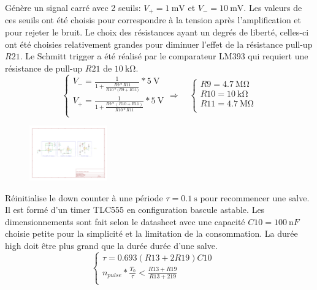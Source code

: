 \documentclass[french]{layout/Report}
\begin{document}
\begin{description}[leftmargin=!,labelwidth=3cm, labelindent=\parindent]
	\item[Schmitt trigger]
        Génère un signal carré avec 2 seuils: $V_+ = \SI{1}{\milli\volt}$ et $V_- = \SI{10}{\milli\volt}$.
        Les valeurs de ces seuils ont été choisis pour correspondre à la tension après l'amplification et pour rejeter le bruit.
        Le choix des résistances ayant un degrés de liberté, celles-ci ont été choisies relativement grandes pour diminuer l'effet de la résistance pull-up $\mathit{R21}$.
        Le Schmitt trigger a été réalisé par le comparateur LM393 \cite{LM393} qui requiert une résistance de pull-up $\mathit{R21}$ de $\SI{10}{\kilo\ohm}$.
        	\begin{equation*}
    		\begin{cases}
    			V_- = \frac{1}{1+\frac{\mathit{R9}*\mathit{R11}}{\mathit{R10}*(\mathit{R9+\mathit{R11})}}}*\SI{5}{\volt} \\
    			V_+ = \frac{1}{1+\frac{\mathit{R9}*(\mathit{R10}+\mathit{R11})}{\mathit{R10}*\mathit{R11}}}*\SI{5}{\volt} \\
    		\end{cases}
    		\Rightarrow\quad
    		\begin{cases}
    			\mathit{R9}  = \SI{4.7}{\mega\ohm} \\
    			\mathit{R10} = \SI{10}{\kilo\ohm} \\
    			\mathit{R11} = \SI{4.7}{\mega\ohm} \\
    		\end{cases}
    		\end{equation*}

            \begin{figure}[H]
                \centering
                \includegraphics[width=0.3\textwidth]{fig/schmitt_trigger.pdf}
            \end{figure}

	\item[Burst timer] Réinitialise le down counter à une période $\tau = \SI{0.1}{\second}$ pour recommencer une salve. Il est formé d'un timer TLC555 en configuration bascule astable. Les dimensionnements sont fait selon le datasheet \cite{TLC555} avec une capacité $\mathit{C10} = \SI{100}{\nano F}$ choisie petite pour la simplicité et la limitation de la consommation. La durée high doit être plus grand que la durée durée d'une salve.
		\begin{equation*}
			\begin{cases}
				\tau = 0.693(\mathit{R13}+2\mathit{R19})\mathit{C10} \\
				n_{pulse}*\frac{T_0}{\tau} < \frac{\mathit{R13}+\mathit{R19}}{\mathit{R13}+2\mathit{19}} \\
			\end{cases}
		\quad\
		\
	\end{equation*}

\end{description}
\end{document}
